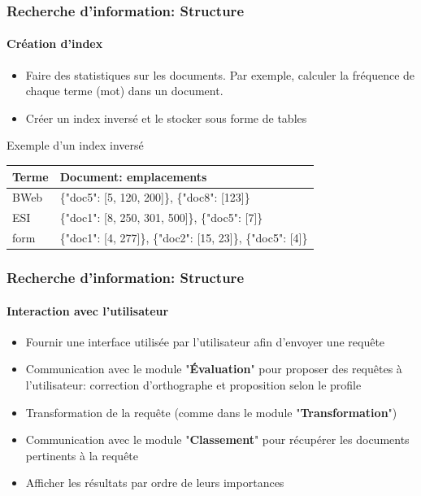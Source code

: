 \documentclass{beamer}
\begin{document}
\begin{frame}
\frametitle{Recherche d'information: Structure}
\framesubtitle{Création d'index}

\begin{itemize}
	\item Faire des statistiques sur les documents. 
	Par exemple, calculer la fréquence de chaque terme (mot) dans un document. 
	\item Créer un index inversé et le stocker sous forme de tables
\end{itemize}

\begin{exampleblock}{Exemple d'un index inversé}
	\begin{tabular}{|l|l|}
		\hline
		\textbf{Terme} & \textbf{Document: emplacements} \\
		\hline
		BWeb & \{"doc5": [5, 120, 200]\}, \{"doc8": [123]\} \\\hline
		ESI & \{"doc1": [8, 250, 301, 500]\}, \{"doc5": [7]\}\\\hline
		form & \{"doc1": [4, 277]\}, \{"doc2": [15, 23]\}, \{"doc5": [4]\}\\
		\hline
	\end{tabular}
\end{exampleblock}

\end{frame}

\begin{frame}
\frametitle{Recherche d'information: Structure}
\framesubtitle{Interaction avec l'utilisateur}

\begin{itemize}
	\item Fournir une interface utilisée par l'utilisateur afin d'envoyer une requête
	\item Communication avec le module "\textbf{Évaluation}" pour proposer des requêtes à l'utilisateur: correction d'orthographe et proposition selon le profile 
	\item Transformation de la requête (comme dans le module "\textbf{Transformation}")
	\item Communication avec le module "\textbf{Classement}" pour récupérer les documents pertinents à la requête
	\item Afficher les résultats par ordre de leurs importances
\end{itemize}

\end{frame}
\end{document}
